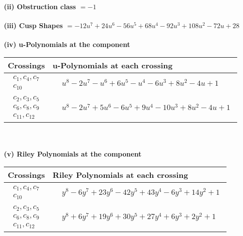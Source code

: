 \documentclass[1p]{elsarticle_modified}
\theoremstyle{definition}
\begin{document}
\flushleft \textbf{(ii) Obstruction class $= -1$}\\~\\
\flushleft \textbf{(iii) Cusp Shapes $= -12 u^7+24 u^6-56 u^5+68 u^4-92 u^3+108 u^2-72 u+28$}\\~\\
\newpage\renewcommand{\arraystretch}{1}
\flushleft \textbf{(iv) u-Polynomials at the component}\newline \\
\begin{tabular}{m{50pt}|m{274pt}}
Crossings & \hspace{64pt}u-Polynomials at each crossing \\
\hline $$\begin{aligned}c_{1},c_{4},c_{7}\\c_{10}\end{aligned}$$&$\begin{aligned}
&u^8-2 u^7- u^6+6 u^5- u^4-6 u^3+8 u^2-4 u+1
\end{aligned}$\\
\hline $$\begin{aligned}c_{2},c_{3},c_{5}\\c_{6},c_{8},c_{9}\\c_{11},c_{12}\end{aligned}$$&$\begin{aligned}
&u^8-2 u^7+5 u^6-6 u^5+9 u^4-10 u^3+8 u^2-4 u+1
\end{aligned}$\\
\hline
\end{tabular}\\~\\
\newpage\renewcommand{\arraystretch}{1}
\flushleft \textbf{(v) Riley Polynomials at the component}\newline \\
\begin{tabular}{m{50pt}|m{274pt}}
Crossings & \hspace{64pt}Riley Polynomials at each crossing \\
\hline $$\begin{aligned}c_{1},c_{4},c_{7}\\c_{10}\end{aligned}$$&$\begin{aligned}
&y^8-6 y^7+23 y^6-42 y^5+43 y^4-6 y^3+14 y^2+1
\end{aligned}$\\
\hline $$\begin{aligned}c_{2},c_{3},c_{5}\\c_{6},c_{8},c_{9}\\c_{11},c_{12}\end{aligned}$$&$\begin{aligned}
&y^8+6 y^7+19 y^6+30 y^5+27 y^4+6 y^3+2 y^2+1
\end{aligned}$\\
\hline
\end{tabular}\\~\\
\end{document}
